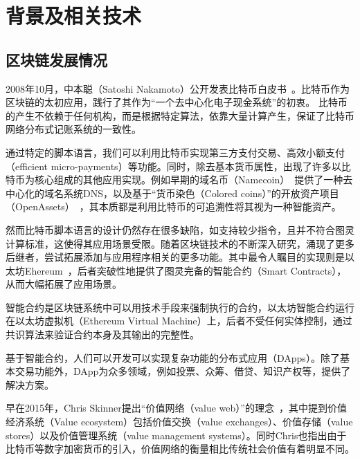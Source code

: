 
\section{背景及相关技术}



\subsection{区块链发展情况}
2008年10月，中本聪（Satoshi Nakamoto）公开发表比特币白皮书~\cite{Nakamoto2008}。比特币作为区块链的太初应用，践行了其作为“一个去中心化电子现金系统”的初衷。 比特币的产生不依赖于任何机构，而是根据特定算法，依靠大量计算产生，保证了比特币网络分布式记账系统的一致性。

通过特定的脚本语言，我们可以利用比特币实现第三方支付交易、高效小额支付（efficient micro-payments）等功能。同时，除去基本货币属性，出现了许多以比特币为核心组成的其他应用实现。例如早期的域名币（Namecoin）~\cite{Namecoin}提供了一种去中心化的域名系统DNS，以及基于“货币染色（Colored coins）”的开放资产项目（OpenAssets）~\cite{OpenAssets}，其本质都是利用比特币的可追溯性将其视为一种智能资产。


然而比特币脚本语言的设计仍然存在很多缺陷，如支持较少指令，且并不符合图灵计算标准，这使得其应用场景受限。随着区块链技术的不断深入研究，涌现了更多后继者，尝试拓展添加与应用程序相关的更多功能。其中最令人瞩目的实现则是以太坊Ehereum~\cite{buterin2013ethereum}，后者突破性地提供了图灵完备的智能合约（Smart Contracts），从而大幅拓展了应用场景。

智能合约是区块链系统中可以用技术手段来强制执行的合约，以太坊智能合约运行在以太坊虚拟机（Ethereum Virtual Machine）上，后者不受任何实体控制，通过共识算法来验证合约本身及其输出的完整性。

基于智能合约，人们可以开发可以实现复杂功能的分布式应用（DApps）。除了基本交易功能外，DApp为众多领域，例如投票、众筹、借贷、知识产权等，提供了解决方案。


早在2015年，Chris Skinner提出“价值网络（value web）”的理念~\cite{ChrisSkinner}，其中提到价值经济系统（Value ecosystem）包括价值交换（value exchanges）、价值存储（value stores）以及价值管理系统（value management systems）。同时Chris也指出由于比特币等数字加密货币的引入，价值网络的衡量相比传统社会价值有着明显不同。

